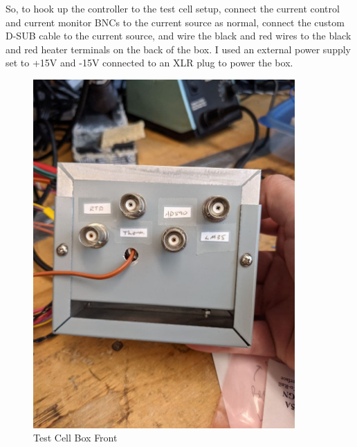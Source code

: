 \documentclass[11pt, letterpaper]{article}
\begin{document}
So, to hook up the controller to the test cell setup, connect the current control and current monitor BNCs to the current source as normal, connect the custom D-SUB cable to the current source, and wire the black and red wires to the black and red heater terminals on the back of the box. I used an external power supply set to +15V and -15V connected to an XLR plug to power the box.

\begin{figure}[H]
    \centering
    \includegraphics[width=10cm]{testCellBoxFront.jpg}
    \caption{ Test Cell Box Front }
    \label{fig:testCellBoxFront}
\end{figure}
\end{document}
